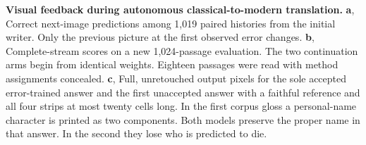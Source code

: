 \textbf{Visual feedback during autonomous classical-to-modern translation.} \textbf{a}, Correct next-image predictions among 1,019 paired histories from the initial writer. Only the previous picture at the first observed error changes. \textbf{b}, Complete-stream scores on a new 1,024-passage evaluation. The two continuation arms begin from identical weights. Eighteen passages were read with method assignments concealed. \textbf{c}, Full, unretouched output pixels for the sole accepted error-trained answer and the first unaccepted answer with a faithful reference and all four strips at most twenty cells long. In the first corpus gloss a personal-name character is printed as two components. Both models preserve the proper name in that answer. In the second they lose who is predicted to die.
